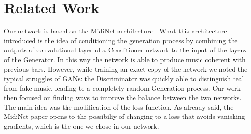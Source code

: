 
\section{Related Work}
\label{sec:related_work}
Our network is based on the MidiNet architecture \cite{Yang-2017}. 
What this architecture introduced is the idea of conditioning the generation process by combining the outputs of convolutional layer of a Conditioner network to the input of the layers of the Generator.
In this way the network is able to produce music coherent with previous bars. However, while training an exact copy of the network we noted the typical struggles of GANs: the Discriminator was quickly able to distinguish real from fake music, leading to a completely random Generation process.
Our work then focused on finding ways to improve the balance between the two networks. The main idea was the modification of the loss function. As already said, the MidiNet paper opens to the possibiliy of changing to a loss that avoids vanishing gradients, which is the one we chose in our network. 